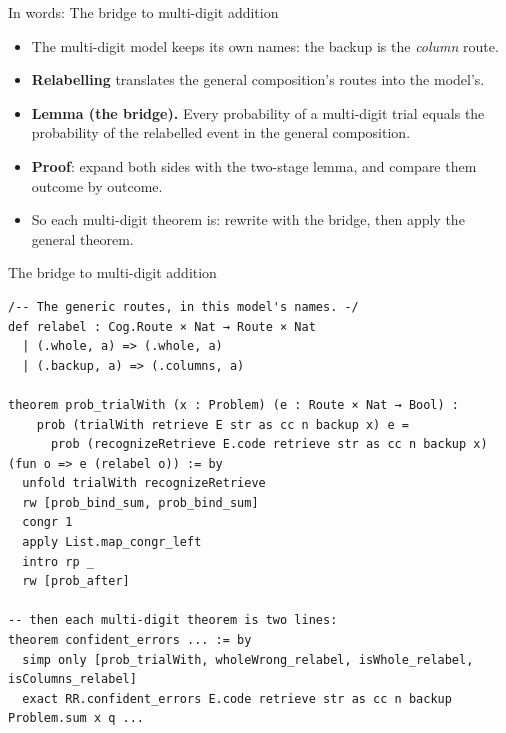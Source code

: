\documentclass[aspectratio=169,11pt]{beamer}
\begin{document}
\begin{frame}{In words: The bridge to multi-digit addition}
  \begin{itemize}
    \item The multi-digit model keeps its own names: the backup is the \emph{column} route.
    \item \textbf{Relabelling} translates the general composition's routes into the model's.
    \item \textbf{Lemma (the bridge).} Every probability of a multi-digit trial equals the probability of the relabelled event in the general composition.
    \item \textbf{Proof}: expand both sides with the two-stage lemma, and compare them outcome by outcome.
    \item So each multi-digit theorem is: rewrite with the bridge, then apply the general theorem.
  \end{itemize}
\end{frame}


\begin{frame}[fragile]{The bridge to multi-digit addition}
\begin{Verbatim}
/-- The generic routes, in this model's names. -/
def relabel : Cog.Route × Nat → Route × Nat
  | (.whole, a) => (.whole, a)
  | (.backup, a) => (.columns, a)

theorem prob_trialWith (x : Problem) (e : Route × Nat → Bool) :
    prob (trialWith retrieve E str as cc n backup x) e =
      prob (recognizeRetrieve E.code retrieve str as cc n backup x) (fun o => e (relabel o)) := by
  unfold trialWith recognizeRetrieve
  rw [prob_bind_sum, prob_bind_sum]
  congr 1
  apply List.map_congr_left
  intro rp _
  rw [prob_after]

-- then each multi-digit theorem is two lines:
theorem confident_errors ... := by
  simp only [prob_trialWith, wholeWrong_relabel, isWhole_relabel, isColumns_relabel]
  exact RR.confident_errors E.code retrieve str as cc n backup Problem.sum x q ...
\end{Verbatim}
\end{frame}
\end{document}
